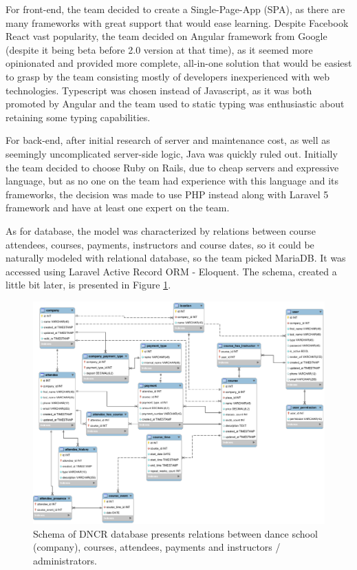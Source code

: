 \documentclass{article}
\begin{document}
For front-end, the team decided to create a Single-Page-App (SPA), as there are many frameworks with great support that would ease learning. Despite Facebook React vast popularity, the team decided on Angular framework from Google (despite it being beta before 2.0 version at that time), as it seemed more opinionated and provided more complete, all-in-one solution that would be easiest to grasp by the team consisting mostly of developers inexperienced with web technologies. Typescript was chosen instead of Javascript, as it was both promoted by Angular and the team used to static typing was enthusiastic about retaining some typing capabilities.

For back-end, after initial research of server and maintenance cost, as well as seemingly uncomplicated server-side logic, Java was quickly ruled out. Initially the team decided to choose Ruby on Rails, due to cheap servers and expressive language, but as no one on the team had experience with this language and its frameworks, the decision was made to use PHP instead along with Laravel 5 framework and have at least one expert on the team.

As for database, the model was characterized by relations between course attendees, courses, payments, instructors and course dates, so it could be naturally modeled with relational database, so the team picked MariaDB. It was accessed using Laravel Active Record ORM - Eloquent. The schema, created a little bit later, is presented in Figure \ref{fig:schema}.

\begin{figure}[h]
    \includegraphics[width=\textwidth]{schema}
    \caption{Schema of DNCR database presents relations between dance school (company), courses, attendees, payments and instructors / administrators.}
    \label{fig:schema} 
\end{figure}
\end{document}
